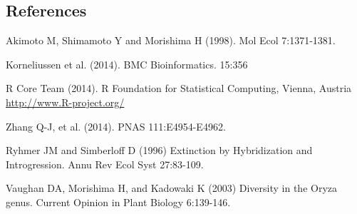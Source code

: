 \documentclass[final]{beamer}
\begin{document}
\begin{frame}[t]
\begin{multicols}{3}

\section{References}

\begin{thebibliography}{99}

 Akimoto M, Shimamoto Y and Morishima H (1998). Mol Ecol 7:1371-1381.

%

 Korneliussen et al. (2014). BMC Bioinformatics. 15:356

 R Core Team (2014). R Foundation for Statistical Computing, Vienna, Austria \url{http://www.R-project.org/}

 Zhang Q-J, et al. (2014). PNAS 111:E4954-E4962.

Ryhmer JM and Simberloff D (1996) Extinction by Hybridization and Introgression. Annu Rev Ecol Syst 27:83-109.

Vaughan DA, Morishima H, and Kadowaki K (2003) Diversity in the Oryza genus. Current Opinion in Plant Biology 6:139-146.

\end{thebibliography}

\end{multicols}

\end{frame}
\end{document}
